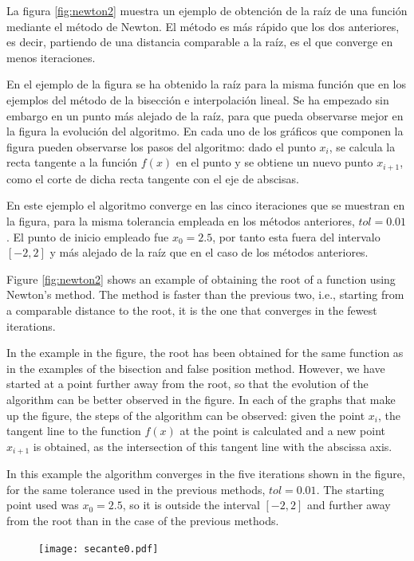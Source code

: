 \begin{paracol}{2}
La figura \ref{fig:newton2} muestra un ejemplo de obtención de la raíz de una función mediante el método de Newton. El método es más rápido que los dos anteriores, es decir, partiendo de una distancia comparable a la raíz, es el que converge en menos iteraciones. 

En el ejemplo de la figura se ha obtenido la raíz para la misma función que en los ejemplos del método de la bisección e interpolación lineal. Se ha empezado sin embargo en un punto más alejado de la raíz, para que pueda observarse mejor en la figura la evolución del algoritmo. En cada uno de los gráficos que componen la figura pueden observarse  los pasos del algoritmo: dado el punto  $x_i$, se calcula  la recta tangente a la función $f(x)$ en el punto y se obtiene un nuevo punto $x_{i+1}$,  como el corte de dicha recta tangente con el eje de abscisas.

En este ejemplo el algoritmo converge en las cinco iteraciones que se muestran en la figura, para la misma tolerancia empleada en los métodos anteriores, $tol=0.01$. El punto de inicio empleado fue $x_0=2.5$, por tanto esta fuera del intervalo $[-2, 2]$ y más alejado de la raíz que en el caso de los métodos anteriores.   

\switchcolumn

Figure \ref{fig:newton2} shows an example of obtaining the root of a function using Newton's method. The method is faster than the previous two, i.e., starting from a comparable distance to the root, it is the one that converges in the fewest iterations.

In the example in the figure, the root has been obtained for the same function as in the examples of the bisection and false position method. However, we have started at a point further away from the root, so that the evolution of the algorithm can be better observed in the figure. In each of the graphs that make up the figure, the steps of the algorithm can be observed: given the point $x_i$, the tangent line to the function $f(x)$ at the point is calculated and a new point $x_{i+1}$ is obtained, as the intersection of this tangent line with the abscissa axis.

In this example the algorithm converges in the five iterations shown in the figure, for the same tolerance used in the previous methods, $tol=0.01$. The starting point used was $x_0=2.5$, so it is outside the interval $[-2, 2]$ and further away from the root than in the case of the previous methods.   

\end{paracol}
\begin{figure}
	\texttt{[image: secante0.pdf]}
	\label{fig:secante}
\end{figure}


